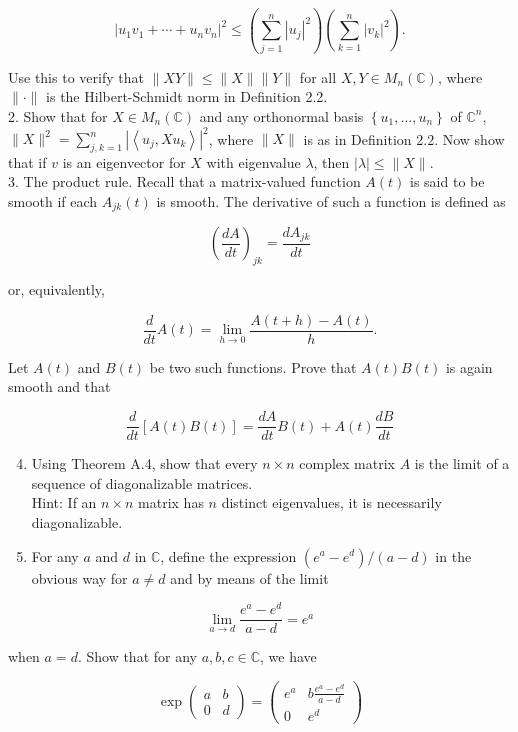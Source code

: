 \documentclass[10pt, letterpaper]{article}
\begin{document}
$$
\left|u_{1} v_{1}+\cdots+u_{n} v_{n}\right|^{2} \leq\left(\sum_{j=1}^{n}\left|u_{j}\right|^{2}\right)\left(\sum_{k=1}^{n}\left|v_{k}\right|^{2}\right) .
$$

Use this to verify that $\|X Y\| \leq\|X\|\|Y\|$ for all $X, Y \in M_{n}(\mathbb{C})$, where $\|\cdot\|$ is the Hilbert-Schmidt norm in Definition 2.2.\\
2. Show that for $X \in M_{n}(\mathbb{C})$ and any orthonormal basis $\left\{u_{1}, \ldots, u_{n}\right\}$ of $\mathbb{C}^{n}$, $\|X\|^{2}=\sum_{j, k=1}^{n}\left|\left\langle u_{j}, X u_{k}\right\rangle\right|^{2}$, where $\|X\|$ is as in Definition 2.2. Now show that if $v$ is an eigenvector for $X$ with eigenvalue $\lambda$, then $|\lambda| \leq\|X\|$.\\
3. The product rule. Recall that a matrix-valued function $A(t)$ is said to be smooth if each $A_{j k}(t)$ is smooth. The derivative of such a function is defined as

$$
\left(\frac{d A}{d t}\right)_{j k}=\frac{d A_{j k}}{d t}
$$

or, equivalently,

$$
\frac{d}{d t} A(t)=\lim _{h \rightarrow 0} \frac{A(t+h)-A(t)}{h} .
$$

Let $A(t)$ and $B(t)$ be two such functions. Prove that $A(t) B(t)$ is again smooth and that

$$
\frac{d}{d t}[A(t) B(t)]=\frac{d A}{d t} B(t)+A(t) \frac{d B}{d t}
$$

\begin{enumerate}
  \setcounter{enumi}{3}
  \item Using Theorem A.4, show that every $n \times n$ complex matrix $A$ is the limit of a sequence of diagonalizable matrices.\\
Hint: If an $n \times n$ matrix has $n$ distinct eigenvalues, it is necessarily diagonalizable.
  \item For any $a$ and $d$ in $\mathbb{C}$, define the expression $\left(e^{a}-e^{d}\right) /(a-d)$ in the obvious way for $a \neq d$ and by means of the limit
\end{enumerate}

$$
\lim _{a \rightarrow d} \frac{e^{a}-e^{d}}{a-d}=e^{a}
$$

when $a=d$. Show that for any $a, b, c \in \mathbb{C}$, we have

$$
\exp \left(\begin{array}{ll}
a & b \\
0 & d
\end{array}\right)=\left(\begin{array}{cc}
e^{a} & b \frac{e^{a}-e^{d}}{a-d} \\
0 & e^{d}
\end{array}\right)
$$
\end{document}
